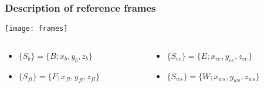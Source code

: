 \begin{frame}
  \centering
  \frametitle{Description of reference frames}
  \texttt{[image: frames]}
  \begin{columns}
    \begin{column}{0.45\textwidth}
      \begin{itemize}
      \item[]$\{S_b\} = \{B; x_b, y_b, z_b \}$
      \item[]$\{S_{fl}\} = \{F; x_{fl}, y_{fl}, z_{fl} \}$
      \end{itemize}
    \end{column}
    \begin{column}{0.45\textwidth}
      \begin{itemize}
      \item[]$\{S_{ee}\} = \{E; x_{ee}, y_{ee}, z_{ee} \}$
      \item[]$\{S_{ws}\} = \{W; x_{ws}, y_{ws}, z_{ws} \}$
      \end{itemize}
    \end{column}
  \end{columns}
\end{frame}
